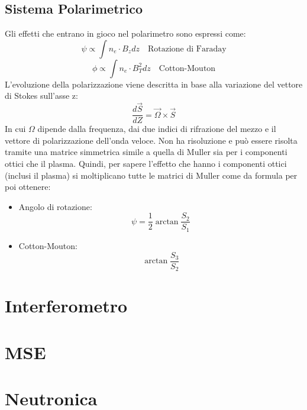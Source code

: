 \documentclass{article}
\begin{document}
\subsection{Sistema Polarimetrico}
Gli effetti che entrano in gioco nel polarimetro sono espressi come:
\begin{equation}
    \psi\propto \int n_{e}\cdot B_{z}dz\quad\text{Rotazione di Faraday}
\end{equation}
\begin{equation}
    \phi\propto \int n_{e}\cdot B_{T}^{2}dz\quad \text{Cotton-Mouton}
\end{equation}
L'evoluzione della polarizzazione viene descritta in base alla variazione del vettore di Stokes sull'asse z:
\begin{equation}
    \frac{d\overrightarrow{S}}{dZ}=\overrightarrow{\Omega}\times\overrightarrow{S}
\end{equation}
In cui \(\Omega\) dipende dalla frequenza, dai due indici di rifrazione del mezzo e il vettore di polarizzazione dell'onda veloce. Non ha risoluzione e può essere risolta tramite una matrice simmetrica simile a quella di Muller sia per i componenti ottici che il plasma.\newline
Quindi, per sapere l'effetto che hanno i componenti ottici (inclusi il plasma) si moltiplicano tutte le matrici di Muller come da formula per poi ottenere:
\begin{itemize}
    \item Angolo di rotazione:
    \begin{equation}
    \psi =\frac{1}{2}\arctan{\frac{S_{2}}{S_{1}}}
    \end{equation}
    \item Cotton-Mouton: \begin{equation}
        \arctan{\frac{S_{3}}{S_{2}}}
    \end{equation}
\end{itemize}

\section{Interferometro}
\section{MSE}
\section{Neutronica}
\end{document}
